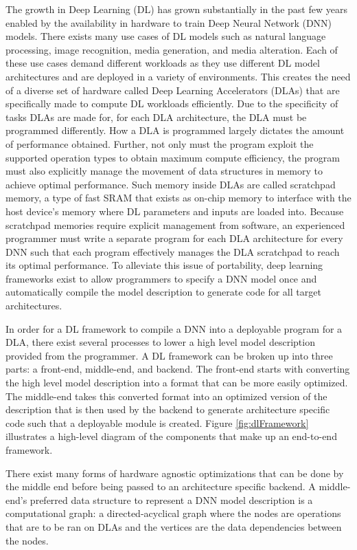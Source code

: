 The growth in Deep Learning (DL) has grown substantially in the past few years
enabled by the availability in hardware to train Deep Neural Network (DNN)
models. There exists many use cases of DL models such as natural language
processing, image recognition, media generation, and media alteration. Each of
these use cases demand different workloads as they use different DL model
architectures and are deployed in a variety of environments. This creates the
need of a diverse set of hardware called Deep Learning Accelerators (DLAs) that
are specifically made to compute DL workloads efficiently. Due to the
specificity of tasks DLAs are made for, for each DLA architecture, the DLA must
be programmed differently. How a DLA is programmed largely dictates the amount
of performance obtained. Further, not only must the program exploit the
supported operation types to obtain maximum compute efficiency, the program
must also explicitly manage the movement of data structures in memory to
achieve optimal performance. Such memory inside DLAs are called scratchpad
memory, a type of fast SRAM that exists as on-chip memory to interface with the
host device's memory where DL parameters and inputs are loaded into. Because
scratchpad memories require explicit management from software, an experienced
programmer must write a separate program for each DLA architecture for every
DNN such that each program effectively manages the DLA scratchpad to reach its
optimal performance. To alleviate this issue of portability, deep learning
frameworks exist to allow programmers to specify a DNN model once and
automatically compile the model description to generate code for all target
architectures.

In order for a DL framework to compile a DNN into a deployable program for a
DLA, there exist several processes to lower a high level model description
provided from the programmer. A DL framework can be broken up into three parts:
a front-end, middle-end, and backend. The front-end starts with converting the
high level model description into a format that can be more easily optimized.
The middle-end takes this converted format into an optimized version of the
description that is then used by the backend to generate architecture specific
code such that a deployable module is created. Figure \ref{fig:dlFramework}
illustrates a high-level diagram of the components that make up an end-to-end
framework.

There exist many forms of hardware agnostic optimizations that can be done by
the middle end before being passed to an architecture specific backend. A
middle-end's preferred data structure to represent a DNN model description
is a computational graph: a directed-acyclical graph where the nodes are operations
that are to be ran on DLAs and the vertices are the data dependencies between
the nodes. 

